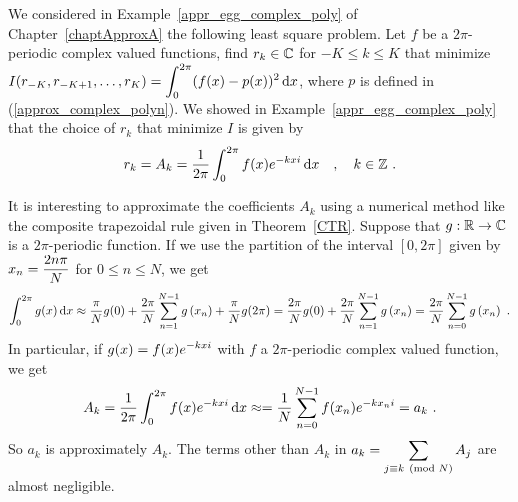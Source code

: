 \begin{rmk}
We considered in Example~\ref{appr_egg_complex_poly} of
Chapter~\ref{chaptApproxA} the following least square problem.
Let $f$ be a $2\pi$-periodic complex valued functions, find $r_k \in \mathbb{C}$ for
$-K\leq k \leq K$ that minimize
$\displaystyle I(r_{-K}, r_{-K+1}, \ldots, r_K) =
\int_0^{2\pi} (f(x)-p(x))^2 \,\mathrm{d}x$,
where $p$ is defined in (\ref{approx_complex_polyn}).  We showed in
Example~\ref{appr_egg_complex_poly} that the choice of $r_k$ that minimize
$I$ is given by
\[
r_k = A_k = \frac{1}{2\pi} \int_0^{2\pi} f(x) e^{-kx i} \,\mathrm{d}x \quad , \quad
k \in \mathbb{Z} \ .
\]

It is interesting to approximate the coefficients $A_k$ using a numerical
method like the composite trapezoidal rule given in Theorem~\ref{CTR}.
Suppose that $g:\mathbb{R} \rightarrow \mathbb{C}$ is a $2\pi$-periodic function.
If we use the partition of the interval $[0,2\pi]$ given by
$\displaystyle x_n = \frac{2n \pi}{N}$ for $0 \leq n \leq N$, we get
\[
\int_0^{2\pi} g(x) \,\mathrm{d}x \approx \frac{\pi}{N}g(0) + \frac{2\pi}{N}
\sum_{n=1}^{N-1} g\left(x_n\right) + \frac{\pi}{N}g(2\pi)
= \frac{2\pi}{N}g(0)
+ \frac{2\pi}{N}\sum_{n=1}^{N-1} g\left(x_n\right)
= \frac{2\pi}{N} \sum_{n=0}^{N-1} g\left(x_n\right) \ .
\]
In particular, if $\displaystyle g(x) = f(x) e^{-k x i}$ with $f$ a
$2\pi$-periodic complex valued function, we get
\[
A_k = \frac{1}{2\pi} \int_0^{2\pi} f(x) e^{-k x i} \dx{x}
\approx = \frac{1}{N} \sum_{n=0}^{N-1} f(x_n) e^{-k x_n i} = a_k \ .
\]
So $a_k$ is approximately $A_k$.  The terms other than $A_k$ in
$\displaystyle a_k = \sum_{j\equiv k \pmod{N}} A_j$ are almost negligible.
\end{rmk}

